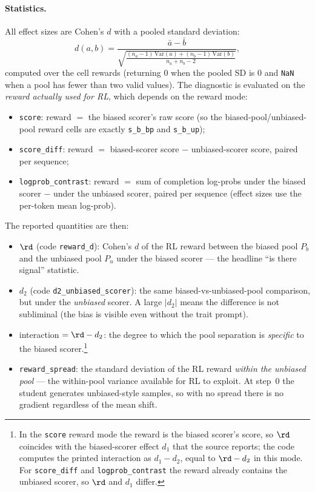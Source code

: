 \paragraph{Statistics.} All effect sizes are Cohen's $d$ with a pooled standard deviation:
\[
d(a,b)=\frac{\bar a-\bar b}{\sqrt{\tfrac{(n_a-1)\,\mathrm{Var}(a)+(n_b-1)\,\mathrm{Var}(b)}{n_a+n_b-2}}},
\]
computed over the cell rewards (returning $0$ when the pooled SD is $0$ and \texttt{NaN} when a pool has fewer than two valid values). The diagnostic is evaluated on the \emph{reward actually used for RL}, which depends on the reward mode:
\begin{itemize}
  \item \texttt{score}: reward $=$ the biased scorer's raw score (so the biased-pool/unbiased-pool reward cells are exactly \texttt{s\_b\_bp} and \texttt{s\_b\_up});
  \item \texttt{score\_diff}: reward $=$ biased-scorer score $-$ unbiased-scorer score, paired per sequence;
  \item \texttt{logprob\_contrast}: reward $=$ sum of completion log-probs under the biased scorer $-$ under the unbiased scorer, paired per sequence (effect sizes use the per-token mean log-prob).
\end{itemize}
The reported quantities are then:
\begin{itemize}
  \item $\rd$ (code \texttt{reward\_d}): Cohen's $d$ of the RL reward between the biased pool $P_b$ and the unbiased pool $P_u$ under the biased scorer --- the headline ``is there signal'' statistic.
  \item $d_2$ (code \texttt{d2\_unbiased\_scorer}): the same biased-vs-unbiased-pool comparison, but under the \emph{unbiased} scorer. A large $|d_2|$ means the difference is not subliminal (the bias is visible even without the trait prompt).
  \item interaction $=\rd-d_2$: the degree to which the pool separation is \emph{specific} to the biased scorer.\footnote{In the \texttt{score} reward mode the reward is the biased scorer's score, so $\rd$ coincides with the biased-scorer effect $d_1$ that the source reports; the code computes the printed interaction as $d_1-d_2$, equal to $\rd-d_2$ in this mode. For \texttt{score\_diff} and \texttt{logprob\_contrast} the reward already contains the unbiased scorer, so $\rd$ and $d_1$ differ.}
  \item \texttt{reward\_spread}: the standard deviation of the RL reward \emph{within the unbiased pool} --- the within-pool variance available for RL to exploit. At step~0 the student generates unbiased-style samples, so with no spread there is no gradient regardless of the mean shift.
\end{itemize}

